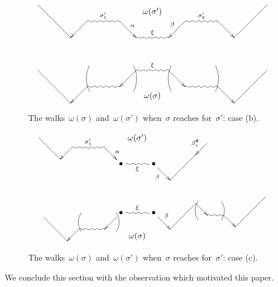 \documentclass{amsart}
\theoremstyle{definition}
\newcommand{\blossom}{^\text{\ding{96}}} %
\begin{document}
\begin{figure}[p]
\[
\xy
%
(-49,21)="-15";
(-35,7)="-14";
(-28,14)="-13";
(-14,14)="-12";
(-7,7)="-11";
(0,18)*+{\omega(\sigma')};
(7,7)="11";
(14,14)="12";
(28,14)="13";
(35,7)="14";
(49,21)="15";
%
{\ar@{-} "-15";"-14"};
{\ar "-13";"-14"};
{\ar@{~}^{\sigma'_1} "-13";"-12"};
{\ar^\alpha "-12";"-11"};
{\ar@{~}^\xi "-11";"11"};
{\ar_\beta "12";"11"};
{\ar@{~}^{\sigma'_2} "12";"13"};
{\ar "13";"14"};
{\ar@{-} "14";"15"};
%
%
(-49,-7)="-5";
(-35,-21)="-4";
(-28,-14)="-3";
(-14,-14)="-2";
(-7,-7)="-1";
(0,-18)*+{\omega(\sigma)};
(7,-7)="1";
(14,-14)="2";
(28,-14)="3";
(35,-21)="4";
(49,-7)="5";
%
{\ar@{-} "-5";"-4"};
{\ar "-3";"-4"};
{\ar@{~} "-3";"-2"};
{\ar "-1";"-2"};
{\ar@{~}^\xi "-1";"1"};
{\ar "1";"2"};
{\ar@{~} "2";"3"};
{\ar "3";"4"};
{\ar@{-} "4";"5"};
%
{\ar@/_.3pc/@{-} (8,-5);(8,-16)};
{\ar@/^.3pc/@{-} (27,-5);(27,-16)};
%
{\ar@/^.3pc/@{-} (-8,-5);(-8,-16)};
{\ar@/_.3pc/@{-} (-27,-5);(-27,-16)};
%
\endxy
\]
    \caption{The walks~$\omega(\sigma)$ and~$\omega(\sigma')$ when~$\sigma$ reaches for~$\sigma'$: case (b).}
    \vspace{1cm}
    \label{fig: dance case b}
\end{figure}

\begin{figure}[p]
\[
\xy
%
(-42,25)="-15";
(-33,16)="-14";
(-28,21)="-13";
(-14,21)="-12";
(-7,14)*+{\bullet}="-11";
(0,25)*+{\omega(\sigma')};
(7,14)*+{\bullet}="11";
(14,7)="12";
(25,18)="13";
(30,23)="14";
%
{\ar@{-} "-15";"-14"};
{\ar "-13";"-14"};
{\ar@{~}^{\sigma'_1} "-13";"-12"};
{\ar^\alpha "-12";"-11"};
{\ar@{~}_\xi "-11";"11"};
{\ar_\beta "11";"12"};
{\ar@{-} "12";"13"};
{\ar_{\beta_s\blossom} "14";"13"};
%
(-40,-9)="-5";
(-30,-19)="-4";
(-25,-14)="-3";
(-14,-14)="-2";
(-7,-7)*+{\bullet}="-1";
(0,-17)*+{\omega(\sigma)};
(7,-7)*+{\bullet}="1";
(14,-14)="2";
(25,-3)="3";
(30,-8)="4";
(37,-8)="5";
(42,-13)="6";
(55,0)="7";
%
{\ar@{-} "-5";"-4"};
{\ar "-3";"-4"};
{\ar@{~} "-3";"-2"};
{\ar "-1";"-2"};
{\ar@{~}^\xi "-1";"1"};
{\ar^\beta "1";"2"};
{\ar@{-} "2";"3"};
{\ar "3";"4"};
{\ar@{~} "4";"5"};
{\ar "5";"6"};
{\ar@{-} "6";"7"};
%
{\ar@/^.3pc/@{-} (-9,-7);(-9,-15)};
{\ar@/_.3pc/@{-} (-24,-7);(-24,-15)};
%
{\ar@/_.3pc/@{-} (26,-2);(26,-10)};
{\ar@/^.3pc/@{-} (36,-2);(36,-10)};
%
\endxy
\]
    \caption{The walks~$\omega(\sigma)$ and~$\omega(\sigma')$ when~$\sigma$ reaches for~$\sigma'$: case (c).}
    \label{fig: dance case c}
\end{figure}

We conclude this section with the observation which motivated this paper.
\end{document}
